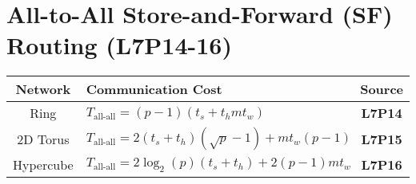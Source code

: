 \section*{All-to-All Store-and-Forward (SF) Routing (\textbf{L7P14-16})}
\begin{tabular}{c|l|c}
  \hline
  Network & Communication Cost & Source \\
  \hline
  Ring & $T_{\text{all-all}} = (p-1)(t_s + t_h mt_{w})$ & \textbf{L7P14} \\
  2D Torus & $T_{\text{all-all}} = 2(t_s + t_h)(\sqrt{p} - 1)+mt_{w}(p-1)$ & \textbf{L7P15}\\
  Hypercube & $T_{\text{all-all}} = 2\log_2(p)(t_s + t_h)+2(p-1)mt_w$ & \textbf{L7P16} \\
  \hline
\end{tabular}
